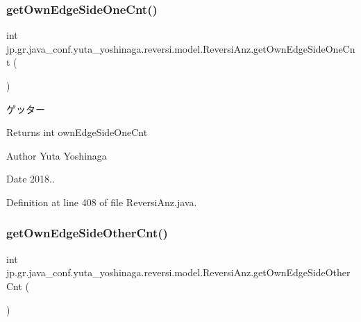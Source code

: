 \subsubsection{\texorpdfstring{get\+Own\+Edge\+Side\+One\+Cnt()}{getOwnEdgeSideOneCnt()}}
{\footnotesize\ttfamily int jp.\+gr.\+java\+\_\+conf.\+yuta\+\_\+yoshinaga.\+reversi.\+model.\+Reversi\+Anz.\+get\+Own\+Edge\+Side\+One\+Cnt (\begin{DoxyParamCaption}{ }\end{DoxyParamCaption})}



ゲッター 

\begin{DoxyReturn}{Returns}
int own\+Edge\+Side\+One\+Cnt 
\end{DoxyReturn}
\begin{DoxyAuthor}{Author}
Yuta Yoshinaga 
\end{DoxyAuthor}
\begin{DoxyDate}{Date}
2018.. 
\end{DoxyDate}


Definition at line 408 of file Reversi\+Anz.\+java.

\mbox{\label{classjp_1_1gr_1_1java__conf_1_1yuta__yoshinaga_1_1reversi_1_1model_1_1_reversi_anz_a14c2d33d5da811348a1874ac10d0b735}} 
\subsubsection{\texorpdfstring{get\+Own\+Edge\+Side\+Other\+Cnt()}{getOwnEdgeSideOtherCnt()}}
{\footnotesize\ttfamily int jp.\+gr.\+java\+\_\+conf.\+yuta\+\_\+yoshinaga.\+reversi.\+model.\+Reversi\+Anz.\+get\+Own\+Edge\+Side\+Other\+Cnt (\begin{DoxyParamCaption}{ }\end{DoxyParamCaption})}



